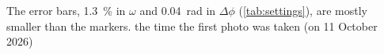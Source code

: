 The error bars, \qty{1.3}{\percent} in $\omega$ and \qty{0.04}{\radian} in $\Delta\phi$ (\cref{tab:settings}), are mostly smaller than the markers.
the time the first photo was taken (on 11 October 2026)
